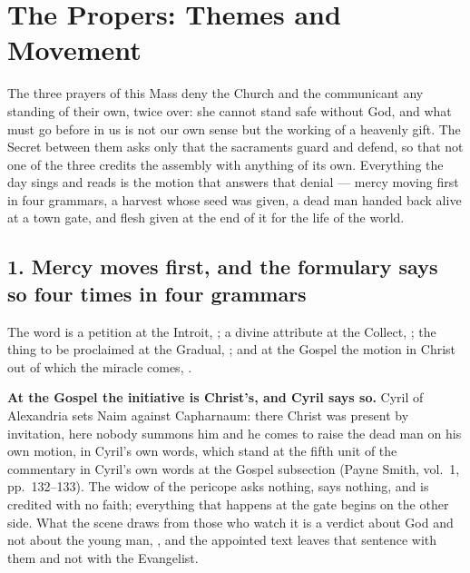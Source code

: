 \sectionguard
\section*{The Propers: Themes and Movement}
\label{triptych:brief-synthesis:start}

The three prayers of this Mass deny the Church and the communicant any standing of
their own, twice over: she cannot stand safe without God, and what must go before
in us is not our own sense but the working of a heavenly gift. The Secret between
them asks only that the sacraments guard and defend, so that not one of the three
credits the assembly with anything of its own. Everything the day
sings and reads is the motion that answers that denial --- mercy moving first in
four grammars, a harvest whose seed was given, a dead man handed back alive at
a town gate, and flesh given at the end of it for the life of the world.

\subsection*{1. Mercy moves first, and the formulary says so four times in four grammars}

The word is a petition at the Introit, ; a divine attribute at the Collect, ; the thing to be proclaimed at the Gradual,
; and at the Gospel the motion in
Christ out of which the miracle comes, .

\textbf{At the Gospel the initiative is Christ's, and Cyril says so.} Cyril of
Alexandria sets Naim against Capharnaum: there Christ was present by invitation,
here nobody summons him and he comes to raise the dead man on his own motion,
\ifdefined\TriptychSynthesisEdition
in Cyril's own words, which stand at the fifth unit of the commentary%
\else
in Cyril's own words at the Gospel subsection%
\fi{} (Payne Smith, vol.~1,
pp.~132--133). The widow of the pericope asks
nothing, says nothing, and is credited with no faith; everything that happens at
the gate begins on the other side. What the scene draws from those who watch it is
a verdict about God and not about the young man, , and the appointed text leaves that sentence with them and not with the
Evangelist.

